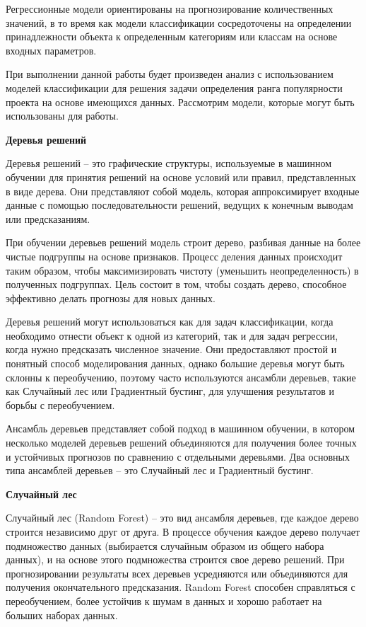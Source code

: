 Регрессионные модели ориентированы на прогнозирование количественных значений, в то время как модели классификации сосредоточены на определении принадлежности объекта к определенным категориям или классам на основе входных параметров. 

При выполнении данной работы будет произведен анализ с использованием моделей классификации для решения задачи определения ранга популярности проекта на основе имеющихся данных. Рассмотрим модели, которые могут быть использованы для работы.

\textbf{Деревья решений}

Деревья решений -- это графические структуры, используемые в машинном обучении для принятия решений на основе условий или правил, представленных в виде дерева. Они представляют собой модель, которая аппроксимирует входные данные с помощью последовательности решений, ведущих к конечным выводам или предсказаниям.

При обучении деревьев решений модель строит дерево, разбивая данные на более чистые подгруппы на основе признаков. Процесс деления данных происходит таким образом, чтобы максимизировать чистоту (уменьшить неопределенность) в полученных подгруппах. Цель состоит в том, чтобы создать дерево, способное эффективно делать прогнозы для новых данных.

Деревья решений могут использоваться как для задач классификации, когда необходимо отнести объект к одной из категорий, так и для задач регрессии, когда нужно предсказать численное значение. Они предоставляют простой и понятный способ моделирования данных, однако большие деревья могут быть склонны к переобучению, поэтому часто используются ансамбли деревьев, такие как Случайный лес или Градиентный бустинг, для улучшения результатов и борьбы с переобучением.

Ансамбль деревьев представляет собой подход в машинном обучении, в котором несколько моделей деревьев решений объединяются для получения более точных и устойчивых прогнозов по сравнению с отдельными деревьями. Два основных типа ансамблей деревьев – это Случайный лес и Градиентный бустинг.

\textbf{Случайный лес}

Случайный лес (Random Forest) -- это вид ансамбля деревьев, где каждое дерево строится независимо друг от друга. В процессе обучения каждое дерево получает подмножество данных (выбирается случайным образом из общего набора данных), и на основе этого подмножества строится свое дерево решений. При прогнозировании результаты всех деревьев усредняются или объединяются для получения окончательного предсказания. Random Forest способен справляться с переобучением, более устойчив к шумам в данных и хорошо работает на больших наборах данных.


